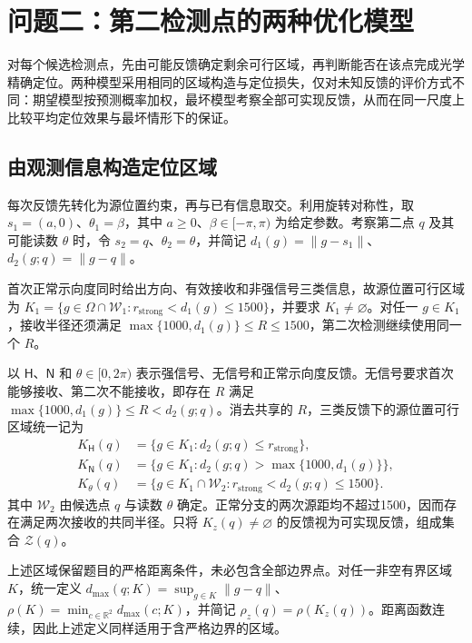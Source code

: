 \section{问题二：第二检测点的两种优化模型}

对每个候选检测点，先由可能反馈确定剩余可行区域，再判断能否在该点完成光学精确定位。两种模型采用相同的区域构造与定位损失，仅对未知反馈的评价方式不同：期望模型按预测概率加权，最坏模型考察全部可实现反馈，从而在同一尺度上比较平均定位效果与最坏情形下的保证。

\subsection{由观测信息构造定位区域}

每次反馈先转化为源位置约束，再与已有信息取交。利用旋转对称性，取 \(s_1=(a,0)\)、\(\theta_1=\beta\)，其中 \(a\ge0\)、\(\beta\in[-\pi,\pi)\) 为给定参数。考察第二点 \(q\) 及其可能读数 \(\theta\) 时，令 \(s_2=q\)、\(\theta_2=\theta\)，并简记 \(d_1(g)=\|g-s_1\|\)、\(d_2(g;q)=\|g-q\|\)。

首次正常示向度同时给出方向、有效接收和非强信号三类信息，故源位置可行区域为 \(K_1=\{g\in\Omega\cap\mathcal W_1:r_{\mathrm{strong}}<d_1(g)\le1500\}\)，并要求 \(K_1\ne\varnothing\)。对任一 \(g\in K_1\)，接收半径还须满足 \(\max\{1000,d_1(g)\}\le R\le1500\)，第二次检测继续使用同一个 \(R\)。

以 \(\mathsf H\)、\(\mathsf N\) 和 \(\theta\in[0,2\pi)\) 表示强信号、无信号和正常示向度反馈。无信号要求首次能够接收、第二次不能接收，即存在 \(R\) 满足 \(\max\{1000,d_1(g)\}\le R<d_2(g;q)\)。消去共享的 \(R\)，三类反馈下的源位置可行区域统一记为
\begin{equation}
\begin{aligned}
K_{\mathsf H}(q)&=\{g\in K_1:d_2(g;q)\le r_{\mathrm{strong}}\},\\
K_{\mathsf N}(q)&=\{g\in K_1:d_2(g;q)>\max\{1000,d_1(g)\}\},\\
K_\theta(q)&=\{g\in K_1\cap\mathcal W_2:r_{\mathrm{strong}}<d_2(g;q)\le1500\}.
\end{aligned}
\label{eq:q2-pair-regions}
\end{equation}
其中 \(\mathcal W_2\) 由候选点 \(q\) 与读数 \(\theta\) 确定。正常分支的两次源距均不超过1500，因而存在满足两次接收的共同半径。只将 \(K_z(q)\ne\varnothing\) 的反馈视为可实现反馈，组成集合 \(\mathcal Z(q)\)。

上述区域保留题目的严格距离条件，未必包含全部边界点。对任一非空有界区域 \(K\)，统一定义 \(d_{\max}(q;K)=\sup_{g\in K}\|g-q\|\)、\(\rho(K)=\min_{c\in\mathbb R^2}d_{\max}(c;K)\)，并简记 \(\rho_z(q)=\rho(K_z(q))\)。距离函数连续，因此上述定义同样适用于含严格边界的区域。

